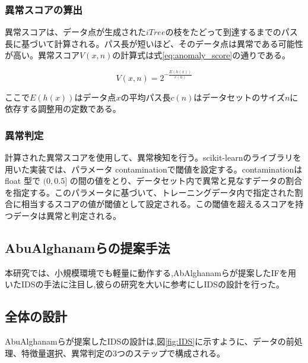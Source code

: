 \documentclass{css}
\begin{document}
\subsubsection{異常スコアの算出}

異常スコアは、データ点が生成された$iTree$の枝をたどって到達するまでのパス長に基づいて計算される。パス長が短いほど、そのデータ点は異常である可能性が高い。異常スコア$V(x,n)$の計算式は式\ref{eq:anomaly_score}の通りである。


\begin{equation}
    V(x, n) = 2^{-\frac{E(h(x))}{c(n)}}
    \label{eq:anomaly_score}
\end{equation}

ここで$E(h(x))$はデータ点$x$の平均パス長$c(n)$はデータセットのサイズ$n$に依存する調整用の定数である。

\subsubsection{異常判定}
計算された異常スコアを使用して、異常検知を行う。scikit-learnのライブラリを用いた実装では、パラメータ contaminationで閾値を設定する。contaminationは float 型で $(0, 0.5]$ の間の値をとり、データセット内で異常と見なすデータの割合を指定する。このパラメータに基づいて、トレーニングデータ内で指定された割合に相当するスコアの値が閾値として設定される。この閾値を超えるスコアを持つデータは異常と判定される。


\subsection{AbuAlghanamらの提案手法}
本研究では、小規模環境でも軽量に動作する,AbAlghanamらが提案したIFを用いたIDSの手法\cite{AbuAlghanam2023-sx}に注目し,彼らの研究を大いに参考にしIDSの設計を行った。

\subsection{全体の設計}
AbuAlghanamらが提案したIDSの設計\cite{AbuAlghanam2023-sx}は,図\ref{fig:IDS}に示すように、データの前処理、特徴量選択、異常判定の3つのステップで構成される。
\end{document}
